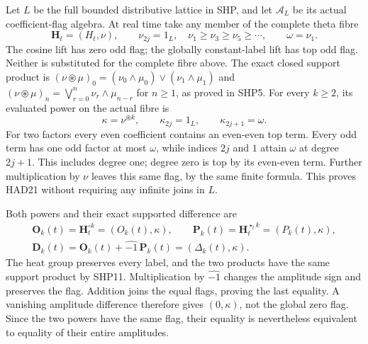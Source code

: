 Let $L$ be the full bounded distributive lattice in SHP,
and let $\mathcal A_L$ be its actual coefficient-flag
algebra. At real time take any member of the complete
theta fibre
\begin{equation}\tag{HAD20}
 \mathbf H_t=(H_t,\nu),\qquad
 \nu_{2j}=1_L,\quad
 \nu_1\ge\nu_3\ge\nu_5\ge\cdots,
 \qquad \omega=\nu_1.
\end{equation}
The cosine lift has zero odd flag; the globally
constant-label lift has top odd flag. Neither is
substituted for the complete fibre above.
The exact closed support product is
$ (\nu\circledast\mu)_0=(\nu_0\wedge\mu_0)
 \vee(\nu_1\wedge\mu_1)$ and
$ (\nu\circledast\mu)_n=\bigvee_{r=0}^n
                \nu_r\wedge\mu_{n-r}$ for $n\ge1$,
as proved in SHP5. For every $k\ge2$, its evaluated
power on the actual fibre is
\begin{equation}\tag{HAD21}
 \kappa=\nu^{\circledast k},\qquad
             \kappa_{2j}=1_L,\qquad\kappa_{2j+1}=\omega.
\end{equation}
For two factors every even coefficient contains an
even-even top term. Every odd term has one odd
factor at most $\omega$, while indices $2j$ and $1$
attain $\omega$ at degree $2j+1$. This includes
degree one; degree zero is top by its even-even
term. Further multiplication by $\nu$ leaves this
same flag, by the same finite formula. This proves
HAD21 without requiring any infinite joins in $L$.

Both powers and their exact supported difference are
\begin{equation}\tag{HAD22}
\begin{gathered}
 \mathbf O_k(t)=\mathbf H_t^{\circ k}=(O_k(t),\kappa),\qquad
 \mathbf P_k(t)=\mathbf H_t^{\star_t k}=(P_k(t),\kappa),\\
 \mathbf D_k(t)=\mathbf O_k(t)+\widehat{-1}\,\mathbf P_k(t)
                           =(\Delta_k(t),\kappa).
\end{gathered}
\end{equation}
The heat group preserves every label, and the two
products have the same support product by SHP11.
Multiplication by $\widehat{-1}$ changes the amplitude
sign and preserves the flag. Addition joins the
equal flags, proving the last equality. A vanishing
amplitude difference therefore gives $(0,\kappa)$,
not the global zero flag. Since the two powers have
the same flag, their equality is nevertheless
equivalent to equality of their entire amplitudes.


